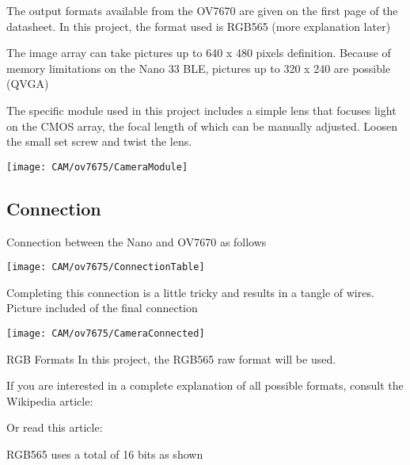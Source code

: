 The output formats available from the OV7670 are given on the first page of the datasheet. In this project, the format used is RGB565 (more explanation later)

The image array can take pictures up to 640 x 480 pixels definition. Because of memory limitations on the Nano 33 BLE, pictures up to 320 x 240 are possible (QVGA)

The specific module used in this project includes a simple lens that focuses light on the CMOS array, the focal length of which can be manually adjusted. Loosen the small set screw and twist the lens.


\begin{center}
    \texttt{[image: CAM/ov7675/CameraModule]}
\end{center}


\subsection{Connection}

Connection between the Nano and OV7670 as follows

\begin{center}
    \texttt{[image: CAM/ov7675/ConnectionTable]}
\end{center}
    
    
Completing this connection is a little tricky and results in a tangle of wires. Picture included of the final connection

\begin{center}
    \texttt{[image: CAM/ov7675/CameraConnected]}
\end{center}
    
    
RGB Formats
In this project, the RGB565 raw format will be used.

If you are interested in a complete explanation of all possible formats, consult the Wikipedia article:


Or read this article:


RGB565 uses a total of 16 bits as shown    
    
